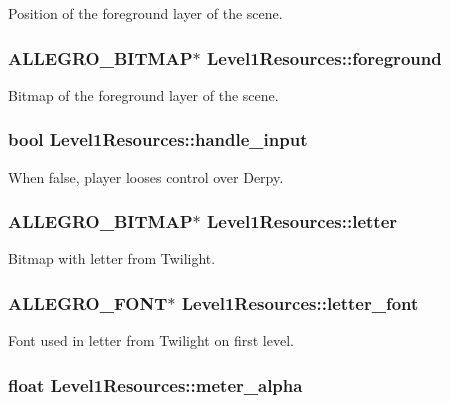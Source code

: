 Position of the foreground layer of the scene. \hypertarget{structLevel1Resources_adfe13dc44e93deb9563219ebafe450f6}{
\subsubsection[{foreground}]{\setlength{\rightskip}{0pt plus 5cm}A\+L\+L\+E\+G\+R\+O\+\_\+\+B\+I\+T\+M\+A\+P$\ast$ Level1\+Resources\+::foreground}}\label{structLevel1Resources_adfe13dc44e93deb9563219ebafe450f6}
Bitmap of the foreground layer of the scene. \hypertarget{structLevel1Resources_a008084a2ce8c21034bbd60b704e45498}{
\subsubsection[{handle\+\_\+input}]{\setlength{\rightskip}{0pt plus 5cm}bool Level1\+Resources\+::handle\+\_\+input}}\label{structLevel1Resources_a008084a2ce8c21034bbd60b704e45498}
When false, player looses control over Derpy. \hypertarget{structLevel1Resources_aed79d724678f5f246be8d64887e9622f}{
\subsubsection[{letter}]{\setlength{\rightskip}{0pt plus 5cm}A\+L\+L\+E\+G\+R\+O\+\_\+\+B\+I\+T\+M\+A\+P$\ast$ Level1\+Resources\+::letter}}\label{structLevel1Resources_aed79d724678f5f246be8d64887e9622f}
Bitmap with letter from Twilight. \hypertarget{structLevel1Resources_a0ce5e6261f8f1dcea79533b46b1b70f1}{
\subsubsection[{letter\+\_\+font}]{\setlength{\rightskip}{0pt plus 5cm}A\+L\+L\+E\+G\+R\+O\+\_\+\+F\+O\+N\+T$\ast$ Level1\+Resources\+::letter\+\_\+font}}\label{structLevel1Resources_a0ce5e6261f8f1dcea79533b46b1b70f1}
Font used in letter from Twilight on first level. \hypertarget{structLevel1Resources_ae5774909dd3a4fe04fb93fe3d20b791e}{
\subsubsection[{meter\+\_\+alpha}]{\setlength{\rightskip}{0pt plus 5cm}float Level1\+Resources\+::meter\+\_\+alpha}}\label{structLevel1Resources_ae5774909dd3a4fe04fb93fe3d20b791e}
